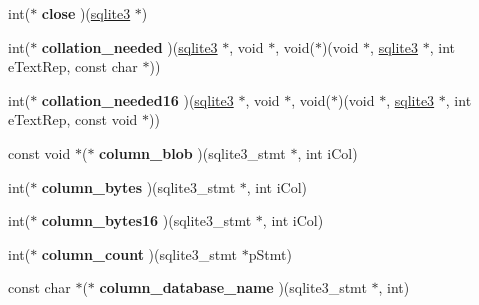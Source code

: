 \begin{DoxyCompactItemize}
\item 
\hypertarget{structsqlite3__api__routines_a26f93f921a5f6709be46902616ca8bcf}{int($\ast$ {\bfseries close} )(\hyperlink{structsqlite3}{sqlite3} $\ast$)}\label{structsqlite3__api__routines_a26f93f921a5f6709be46902616ca8bcf}

\item 
\hypertarget{structsqlite3__api__routines_aa26fb10907a304b5afd943061dd08ab7}{int($\ast$ {\bfseries collation\-\_\-needed} )(\hyperlink{structsqlite3}{sqlite3} $\ast$, void $\ast$, void($\ast$)(void $\ast$, \hyperlink{structsqlite3}{sqlite3} $\ast$, int e\-Text\-Rep, const char $\ast$))}\label{structsqlite3__api__routines_aa26fb10907a304b5afd943061dd08ab7}

\item 
\hypertarget{structsqlite3__api__routines_a35eb5a4b4df8b310e5e9ffbaa735d38f}{int($\ast$ {\bfseries collation\-\_\-needed16} )(\hyperlink{structsqlite3}{sqlite3} $\ast$, void $\ast$, void($\ast$)(void $\ast$, \hyperlink{structsqlite3}{sqlite3} $\ast$, int e\-Text\-Rep, const void $\ast$))}\label{structsqlite3__api__routines_a35eb5a4b4df8b310e5e9ffbaa735d38f}

\item 
\hypertarget{structsqlite3__api__routines_a85459d5ec92d143a2a3da9143112a707}{const void $\ast$($\ast$ {\bfseries column\-\_\-blob} )(sqlite3\-\_\-stmt $\ast$, int i\-Col)}\label{structsqlite3__api__routines_a85459d5ec92d143a2a3da9143112a707}

\item 
\hypertarget{structsqlite3__api__routines_a79150244afb5f778840bc9df72d55342}{int($\ast$ {\bfseries column\-\_\-bytes} )(sqlite3\-\_\-stmt $\ast$, int i\-Col)}\label{structsqlite3__api__routines_a79150244afb5f778840bc9df72d55342}

\item 
\hypertarget{structsqlite3__api__routines_ac1daf0a08de4a33c8db27a29f13a26ad}{int($\ast$ {\bfseries column\-\_\-bytes16} )(sqlite3\-\_\-stmt $\ast$, int i\-Col)}\label{structsqlite3__api__routines_ac1daf0a08de4a33c8db27a29f13a26ad}

\item 
\hypertarget{structsqlite3__api__routines_af750a4727dc59edb4ad2933e28bfa358}{int($\ast$ {\bfseries column\-\_\-count} )(sqlite3\-\_\-stmt $\ast$p\-Stmt)}\label{structsqlite3__api__routines_af750a4727dc59edb4ad2933e28bfa358}

\item 
\hypertarget{structsqlite3__api__routines_a585bc7d559987f0621d7cf2230165e96}{const char $\ast$($\ast$ {\bfseries column\-\_\-database\-\_\-name} )(sqlite3\-\_\-stmt $\ast$, int)}\label{structsqlite3__api__routines_a585bc7d559987f0621d7cf2230165e96}


\end{DoxyCompactItemize}
